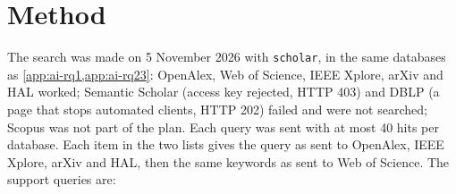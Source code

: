 \section{Method}
\label{sec:ai-rq4-method}


The search was made on 5 November 2026 with \texttt{scholar}, in the same
databases as \cref{app:ai-rq1,app:ai-rq23}: OpenAlex, Web of Science, IEEE
Xplore, arXiv and HAL worked; Semantic Scholar (access key rejected, HTTP 403)
and DBLP (a page that stops automated clients, HTTP 202) failed and were not
searched; Scopus was not part of the plan.
Each query was sent with at most 40 hits per database.
Each item in the two lists gives the query as sent to OpenAlex, IEEE Xplore,
arXiv and HAL, then the same keywords as sent to Web of Science.
The support queries are:
